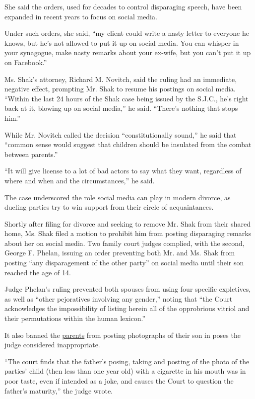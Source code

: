 She said the orders, used for decades to control disparaging speech,
have been expanded in recent years to focus on social media.

Under such orders, she said, ``my client could write a nasty letter to
everyone he knows, but he's not allowed to put it up on social media.
You can whisper in your synagogue, make nasty remarks about your
ex-wife, but you can't put it up on Facebook.''

Ms. Shak's attorney, Richard M. Novitch, said the ruling had an
immediate, negative effect, prompting Mr. Shak to resume his postings on
social media. ``Within the last 24 hours of the Shak case being issued
by the S.J.C., he's right back at it, blowing up on social media,'' he
said. ``There's nothing that stops him.''

While Mr. Novitch called the decision ``constitutionally sound,'' he
said that ``common sense would suggest that children should be insulated
from the combat between parents.''

``It will give license to a lot of bad actors to say what they want,
regardless of where and when and the circumstances,'' he said.

The case underscored the role social media can play in modern divorce,
as dueling parties try to win support from their circle of
acquaintances.

Shortly after filing for divorce and seeking to remove Mr. Shak from
their shared home, Ms. Shak filed a motion to prohibit him from posting
disparaging remarks about her on social media. Two family court judges
complied, with the second, George F. Phelan, issuing an order preventing
both Mr. and Ms. Shak from posting ``any disparagement of the other
party'' on social media until their son reached the age of 14.

Judge Phelan's ruling prevented both spouses from using four specific
expletives, as well as ``other pejoratives involving any gender,''
noting that ``the Court acknowledges the impossibility of listing herein
all of the opprobrious vitriol and their permutations within the human
lexicon.''

It also banned the
\href{https://www.nytimes.com/2020/05/10/us/coronavirus-giving-birth-new-mothers.html}{parents}
from posting photographs of their son in poses the judge considered
inappropriate.

``The court finds that the father's posing, taking and posting of the
photo of the parties' child (then less than one year old) with a
cigarette in his mouth was in poor taste, even if intended as a joke,
and causes the Court to question the father's maturity,'' the judge
wrote.

